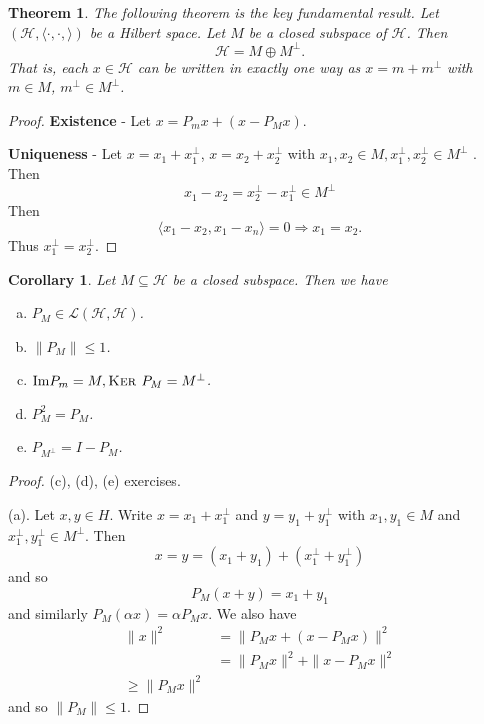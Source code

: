 \documentclass[justified]{tufte-book}
\theoremstyle{plain}%
\newtheorem{thm}{Theorem}[chapter]
\newtheorem*{cor}{Corollary}
\theoremstyle{definition}
\theoremstyle{remark}
\renewcommand{\H}{\mathcal{H}}
\newcommand{\hilb}{(\H, \langle \cdot, \cdot, \rangle )}
\renewcommand{\ker}{\textsc{Ker\ }}
\begin{document}
\begin{thm}
  The following theorem is the key fundamental result.  
  Let $\hilb$ be a Hilbert space.  Let $M$ be a closed subspace of $\H$.  Then \[
       \H = M \oplus M^\perp.
  \]  That is, each $x \in \H$ can be written in exactly one way as $x = m + m^\perp$ with $m \in M$, $m^\perp \in M^\perp$. 
\end{thm}

\begin{proof}
  \textbf{Existence} - Let $x = P_m x + ( x - P_M x)$. 
  
  \textbf{Uniqueness} - Let $x = x_1 + x_1^\perp$, $x = x_2 + x_2^\perp$ with $x_1, x_2 \in M, x_1^\perp, x_2^\perp \in M^\perp$
.  Then \[
  x_1 -x_2 = x^\perp_2 - x_1^\perp \in M^\perp
\] Then \[
  \langle x_1 - x_2, x_1 - x_n \rangle = 0 \Rightarrow x_1 = x_2 .  
\] Thus $x_1^\perp = x_2^\perp$.
\end{proof} 

\begin{cor}
  Let $M \subseteq \H$ be a closed subspace.  Then we have
  \begin{enumerate}[(a)]
      \item $P_M \in \mathcal{L}(\H, \H)$.
      \item $\| P_M \| \leq 1$.
      \item $\text{Im}P_m = M, \ker P_M = M^\perp$.
      \item $P^2_M = P_M$.
      \item $P_{M^\perp} = I - P_M$.
  \end{enumerate} 
\end{cor}
\begin{proof}
  (c), (d), (e) exercises.  
  
  (a).  Let $x,y \in H$.  Write $x = x_1 + x^\perp_1$ and $y = y_1 + y_1^\perp$ with $x_1, y_1 \in M$ and $x_1^\perp, y_1^\perp \in M^\perp$.  Then \[
      x = y = (x_1 + y_1) + (x^\perp_1 + y^\perp_1)
  \] and so \[
      P_M(x+y) = x_1 + y_1
  \] and similarly $P_M(\alpha x) = \alpha P_M x$.  We also have 
  \begin{align*}
      \| x \|^2   &= \|P_M x + (x - P_M x) \|^2 \\
                  &= \| P_M x \|^2 + \| x - P_M x \|^2 \\
                  \geq  \| P_M x \|^2 
  \end{align*} and so $\| P_M \| \leq 1$.  
\end{proof}

\end{document}
